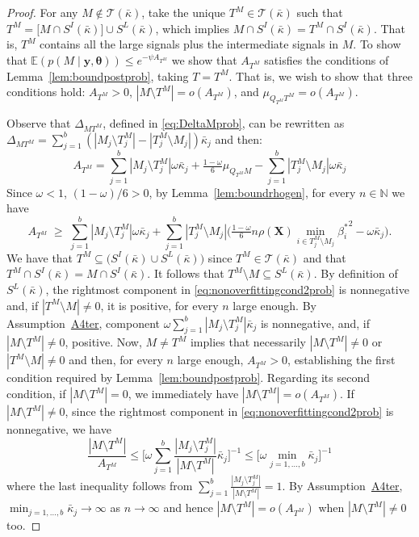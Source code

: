 \documentclass[
  12pt]{article}
\newcommand{\E}{\mathbb{E}}
\newcommand{\N}{\mathbb{N}}
\newcommand{\T}{\mathcal{T}}
\newcommand{\by}{\mathbf{y}}
\newcommand{\btheta}{\boldsymbol{\theta}}
\newcommand{\bX}{\mathbf{X}}
\begin{document}
\begin{proof}
For any $M \not\in\T(\bar{\kappa})$, take the unique $T^M\in\T(\bar{\kappa})$ such that $T^M = \big[M\cap S^{I}(\bar{\kappa})\big]\cup S^L(\bar{\kappa}) $, which implies $M\cap S^{I}(\bar{\kappa})=T^M\cap S^{I}(\bar{\kappa})$. 
That is, $T^M$ contains all the large signals plus the intermediate signals in $M$.
To show that $\E(p(M\mid \by, \btheta)) \leq e^{-\psi A_{T^M}}$ we show that $A_{T^M}$ satisfies the conditions of Lemma~\ref{lem:boundpostprob}, taking $T=T^M$. That is, we wish to show that three conditions hold: $A_{T^M}>0$, $|M\setminus T^M|=o(A_{T^M})$, and $\mu_{Q_{T^M} T^M}=o(A_{T^M})$.

Observe that $\Delta_{MT^M}$, defined in \eqref{eq:DeltaMprob}, can be rewritten as $\Delta_{MT^M}=\sum_{j=1}^b(|M_j\setminus T^M_j|-|T^M_j\setminus M_j|)\bar{\kappa}_j$ and then:
$$ A_{T^M}=\sum_{j=1}^b|M_j\setminus T^M_j|\omega\bar{\kappa}_j+\tfrac{1-\omega}{6}\mu_{Q_{T^M}M}-\sum_{j=1}^b|T^M_j\setminus M_j|\omega\bar{\kappa}_j $$
Since $\omega <1$, $(1-\omega)/6 >0$, by  Lemma~\ref{lem:boundrhogen}, for every $n\in \N$ we have 
\begin{equation}\label{eq:nonoverfittingcond2prob}
   A_{T^M}\;\geq\; \sum_{j=1}^b|M_j \setminus T^M_j|\omega\bar{\kappa}_j + \sum_{j=1}^b |T^M_j\setminus M_j |\Big(\tfrac{1-\omega}{6} n \rho(\bX) \min_{i\in T^M_j\setminus M_j}{\beta^*_i}^{2} - \omega\bar{\kappa}_j\Big).
\end{equation} 
We have that $T^M\subseteq \big(S^I(\bar{\kappa}) \cup S^L(\bar{\kappa})\big)$ since $T^M\in\T(\bar{\kappa})$ and that $T^M\cap S^{I}(\bar{\kappa}) = M\cap S^{I}(\bar{\kappa})$. It follows that $T^M\setminus M \subseteq S^L(\bar{\kappa})$. By definition of $S^L(\bar{\kappa})$, the rightmost component in \eqref{eq:nonoverfittingcond2prob} is nonnegative and, if $|T^M\setminus M|\neq0$, it is positive, for every $n$ large enough. By Assumption~\hyperlink{lab:A4ter}{A4ter}, component $\omega\sum_{j=1}^b|M_j \setminus T^M_j|\bar{\kappa}_j$ is nonnegative, and, if $|M\setminus T^M|\neq0$, positive. Now, $M\neq T^M$ implies that necessarily $|M\setminus T^M|\neq0$ or $|T^M\setminus M|\neq0$ and then, for every $n$ large enough, $A_{T^M}>0$, establishing the first condition required by Lemma~\ref{lem:boundpostprob}. Regarding its second condition, if $|M\setminus T^M|=0$, we immediately have $|M\setminus T^M|=o(A_{T^M})$. If $|M\setminus T^M|\neq 0$, since the rightmost component in \eqref{eq:nonoverfittingcond2prob} is nonnegative, we have
$$\frac{|M\setminus T^M|}{A_{T^M}}\leq \bigg[ \omega\sum_{j=1}^b\frac{|M_j \setminus T^M_j|}{|M\setminus T^M|}\bar{\kappa}_j \bigg]^{-1} \leq \bigg[ \omega\min_{j=1,\ldots,b}\bar{\kappa}_j \bigg]^{-1} $$
where the last inequality follows from $\sum_{j=1}^b\frac{|M_j \setminus T^M_j|}{|M\setminus T^M|}=1$. By Assumption~\hyperlink{lab:A4ter}{A4ter}, $\min_{j=1,\ldots,b}\bar{\kappa}_j\to \infty$ as $n\to\infty$ and hence $|M\setminus T^M|=o(A_{T^M})$ when $|M\setminus T^M|\neq 0$ too.


\end{proof}
\end{document}
